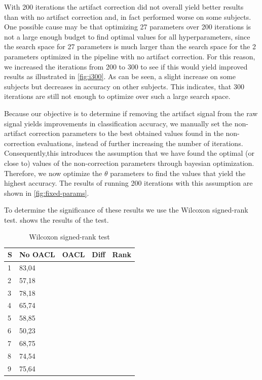 With 200 iterations the artifact correction did not overall yield better results than with no artifact correction and, in fact performed worse on some subjects. One possible cause may be that optimizing 27 parameters over 200 iterations is not a large enough budget to find optimal values for all hyperparameters, since the search space for 27 parameters is much larger than the search space for the 2 parameters optimized in the pipeline with no artifact correction. For this reason, we increased the iterations from 200 to 300 to see if this would yield improved results as illustrated in \cref{fig:i300}. As can be seen, a slight increase on some subjects but decreases in accuracy on other subjects. This indicates, that 300 iterations are still not enough to optimize over such a large search space. 

Because our objective is to determine if removing the artifact signal from the raw signal yields improvements in classification accuracy, we manually set the non-artifact correction parameters to the best obtained values found in the non-correction evaluations, instead of further increasing the number of iterations. Consequently,this introduces the assumption that we have found the optimal (or close to) values of the non-correction parameters through bayesian optimization. Therefore, we now optimize the $\theta$ parameters to find the values that yield the highest accuracy. The results of running 200 iterations with this assumption are shown in \cref{fig:fixed-params}. 

To determine the significance of these results we use the Wilcoxon signed-rank test.  shows the results of the test.

\begin{table}[H]
	\centering
	\caption{Wilcoxon signed-rank test}
	\label{fig:wilcoxon}
	\begin{tabular}{@{}l|llll@{}}
		\toprule
		S & No OACL & OACL & Diff & Rank \\ \midrule
		1 &   83,04            &                 &      &      \\
		2 &   57,18            &                 &      &      \\
		3 &   78,18            &                 &      &      \\
		4 &   65,74            &                 &      &      \\
		5 &   58,85            &                 &      &      \\
		6 &   50,23            &                 &      &      \\
		7 &   68,75            &                 &      &      \\
		8 &   74,54            &                 &      &      \\
		9 &   75,64            &                 &      &      \\ \bottomrule
	\end{tabular}
\end{table}

